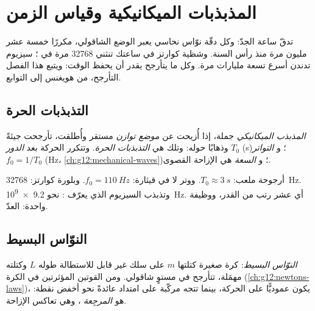 \chapter{المذبذبات الميكانيكية وقياس الزمن}\label{ch:g12:oscillators-and-time}

تدقّ ساعة الجدّ: وكل دقّة نوّاس نحاسي يعبر
الوضع الشاقولي، مكررًا خمسة عشر مليون مرة منذ رأس السنة. وشظية كوارتز
في ساعتك تنثني \num{32768} مرة في ؛  سيزيوم
تدندن أسرع تسعة مليارات مرة. وكل ما يتأرجح يقدر أن يحفظ الوقت:
ويتبع هذا الفصل التأرجح، من هويغنس إلى التوابع.

\section{التذبذبات الحرة}

\begin{definition}\label{def:g12:oscillators-and-time:oscillator}
\emph{المذبذب الميكانيكي} جملة، إذا أُزيحت
عن \emph{موضع توازن} مستقر وأُطلقت،
تأرجحت جيئةً وذهابًا حوله: وتلك هي
\emph{التذبذبات الحرة}. وتتكرر الحركة
بعد \emph{الدور} $T_0$ (\unit{s})؛ و
\emph{التواتر} $f_0 = 1/T_0$
(\unit{Hz}، \cref{ch:g12:mechanical-waves})؛ و
\emph{السعة} هي الإزاحة القصوى.
\end{definition}

\begin{example}\label{ex:g12:oscillators-and-time:zoo}
أرجوحة ملعب: $T_0 \approx \qty{3}{s}$. ووتر لا في قيثارة:
$f_0 = \qty{110}{Hz}$. وبلورة كوارتز: \qty{32768}{Hz}. وتذبذب
السيزيوم الذي يعرّف : نحو \qty{9.2e9}{Hz}. أي عشر رتب
من القدر، ووظيفة واحدة: العدّ.
\end{example}

\section{النوّاس البسيط}

\begin{definition}\label{def:g12:oscillators-and-time:pendulum}
\emph{النوّاس البسيط}: كرة صغيرة كتلتها
$m$ على سلك غير قابل للاستطالة طوله $L$ وكتلته مهمَلة،
تتأرجح في مستوٍ شاقولي. ومن القوتين المؤثرتين في الكرة
(\cref{ch:g12:newtons-laws})، يكون  عموديًّا على
الحركة، بينما تتجه مركّبة  على امتداد  عائدةً
نحو أخفض نقطة:  هو \emph{ المرجِعة}%
، وهي تعاكس الإزاحة.
\end{definition}

